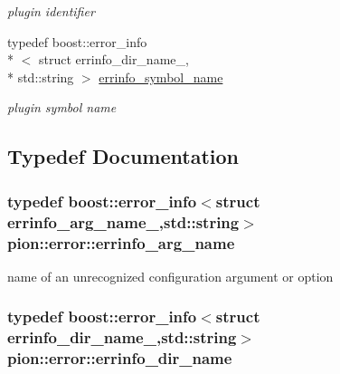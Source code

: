 \begin{DoxyCompactItemize}
\begin{DoxyCompactList}\small\item\em plugin identifier \end{DoxyCompactList}\item 
typedef boost\-::error\-\_\-info\\*
$<$ struct errinfo\-\_\-dir\-\_\-name\-\_\-, \\*
std\-::string $>$ \hyperlink{namespacepion_1_1error_a13c185094e103a8c0bb136923ccfa717}{errinfo\-\_\-symbol\-\_\-name}
\begin{DoxyCompactList}\small\item\em plugin symbol name \end{DoxyCompactList}\end{DoxyCompactItemize}


\subsection{Typedef Documentation}
\hypertarget{namespacepion_1_1error_a490aee146b33a07ff0cf1054379633cf}{
\subsubsection[{errinfo\-\_\-arg\-\_\-name}]{\setlength{\rightskip}{0pt plus 5cm}typedef boost\-::error\-\_\-info$<$struct errinfo\-\_\-arg\-\_\-name\-\_\-,std\-::string$>$ {\bf pion\-::error\-::errinfo\-\_\-arg\-\_\-name}}}\label{namespacepion_1_1error_a490aee146b33a07ff0cf1054379633cf}


name of an unrecognized configuration argument or option 

\hypertarget{namespacepion_1_1error_ac098c77a623d21817e85bc6ee8df5c09}{
\subsubsection[{errinfo\-\_\-dir\-\_\-name}]{\setlength{\rightskip}{0pt plus 5cm}typedef boost\-::error\-\_\-info$<$struct errinfo\-\_\-dir\-\_\-name\-\_\-,std\-::string$>$ {\bf pion\-::error\-::errinfo\-\_\-dir\-\_\-name}}}\label{namespacepion_1_1error_ac098c77a623d21817e85bc6ee8df5c09}


